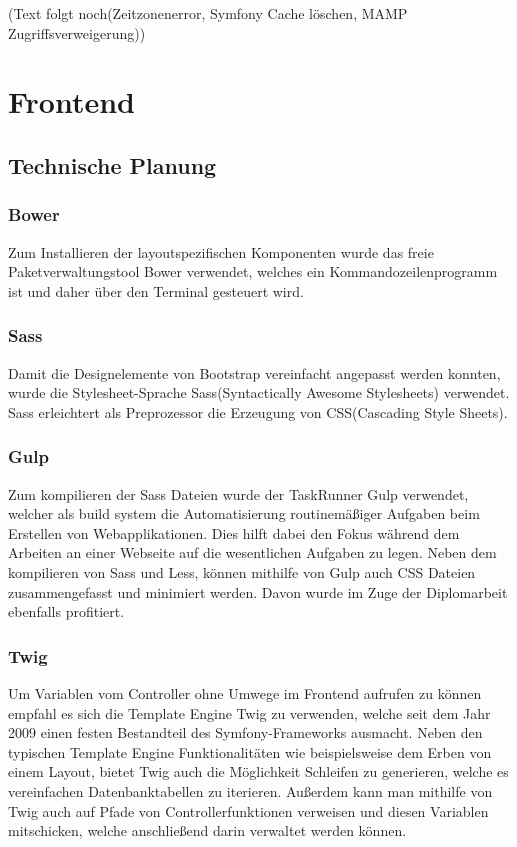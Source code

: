 	(Text folgt noch(Zeitzonenerror, Symfony Cache löschen, MAMP Zugriffsverweigerung))

\section{Frontend}

  \subsection{Technische Planung}

    \subsubsection{Bower}

	Zum Installieren der layoutspezifischen Komponenten wurde das freie Paketverwaltungstool Bower verwendet, welches ein Kommandozeilenprogramm ist und daher über den Terminal gesteuert wird.

    \subsubsection{Sass}

	Damit die Designelemente von Bootstrap vereinfacht angepasst werden konnten, wurde die Stylesheet-Sprache Sass(Syntactically Awesome Stylesheets) verwendet. Sass erleichtert als Preprozessor die Erzeugung von CSS(Cascading Style Sheets).

    \subsubsection{Gulp}

	Zum kompilieren der Sass Dateien wurde der TaskRunner Gulp verwendet, welcher als build system die Automatisierung routinemäßiger Aufgaben beim Erstellen von Webapplikationen. Dies hilft dabei den Fokus während dem Arbeiten an einer Webseite auf die wesentlichen Aufgaben zu legen. Neben dem kompilieren von Sass und Less, können mithilfe von Gulp auch CSS Dateien zusammengefasst und minimiert werden. Davon wurde im Zuge der Diplomarbeit ebenfalls profitiert.

    \subsubsection{Twig}

	Um Variablen vom Controller ohne Umwege im Frontend aufrufen zu können empfahl es sich die Template Engine Twig zu verwenden, welche seit dem Jahr 2009 einen festen Bestandteil des Symfony-Frameworks ausmacht. Neben den typischen Template Engine Funktionalitäten wie beispielsweise dem Erben von einem Layout, bietet Twig auch die Möglichkeit Schleifen zu generieren, welche es vereinfachen Datenbanktabellen zu iterieren. Außerdem kann man mithilfe von Twig auch auf Pfade von Controllerfunktionen verweisen und diesen Variablen mitschicken, welche anschließend darin verwaltet werden können.

